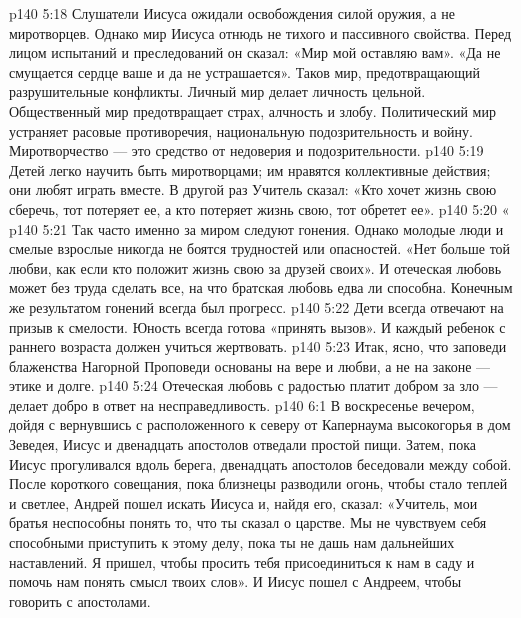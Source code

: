 \vs p140 5:18 \bibnobreakspace {} Слушатели Иисуса ожидали освобождения силой оружия, а не миротворцев. Однако мир Иисуса отнюдь не тихого и пассивного свойства. Перед лицом испытаний и преследований он сказал: «Мир мой оставляю вам». «Да не смущается сердце ваше и да не устрашается». Таков мир, предотвращающий разрушительные конфликты. Личный мир делает личность цельной. Общественный мир предотвращает страх, алчность и злобу. Политический мир устраняет расовые противоречия, национальную подозрительность и войну. Миротворчество --- это средство от недоверия и подозрительности.
\vs p140 5:19 Детей легко научить быть миротворцами; им нравятся коллективные действия; они любят играть вместе. В другой раз Учитель сказал: «Кто хочет жизнь свою сберечь, тот потеряет ее, а кто потеряет жизнь свою, тот обретет ее».
\vs p140 5:20 \bibnobreakspace «
\vs p140 5:21 Так часто именно за миром следуют гонения. Однако молодые люди и смелые взрослые никогда не боятся трудностей или опасностей. «Нет больше той любви, как если кто положит жизнь свою за друзей своих». И отеческая любовь может без труда сделать все, на что братская любовь едва ли способна. Конечным же результатом гонений всегда был прогресс.
\vs p140 5:22 Дети всегда отвечают на призыв к смелости. Юность всегда готова «принять вызов». И каждый ребенок с раннего возраста должен учиться жертвовать.
\vs p140 5:23 \pc Итак, ясно, что заповеди блаженства Нагорной Проповеди основаны на вере и любви, а не на законе --- этике и долге.
\vs p140 5:24 \pc Отеческая любовь с радостью платит добром за зло --- делает добро в ответ на несправедливость.
\vs p140 6:1 В воскресенье вечером, дойдя с вернувшись с расположенного к северу от Капернаума высокогорья в дом Зеведея, Иисус и двенадцать апостолов отведали простой пищи. Затем, пока Иисус прогуливался вдоль берега, двенадцать апостолов беседовали между собой. После короткого совещания, пока близнецы разводили огонь, чтобы стало теплей и светлее, Андрей пошел искать Иисуса и, найдя его, сказал: «Учитель, мои братья неспособны понять то, что ты сказал о царстве. Мы не чувствуем себя способными приступить к этому делу, пока ты не дашь нам дальнейших наставлений. Я пришел, чтобы просить тебя присоединиться к нам в саду и помочь нам понять смысл твоих слов». И Иисус пошел с Андреем, чтобы говорить с апостолами.
